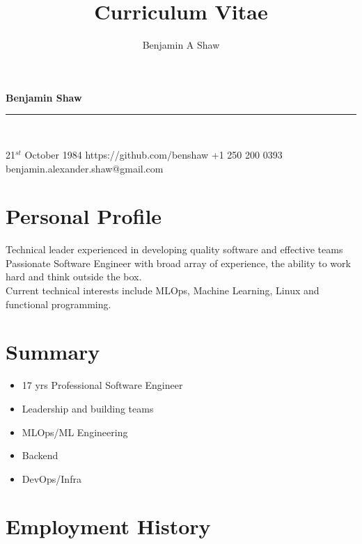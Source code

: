 \documentclass{article}
\title{Curriculum Vitae}
\author{Benjamin A Shaw}
\begin{document}
{\huge{\color{slateblue}\textbf{Benjamin Shaw}}}\\
\rule{\textwidth}{0.5mm}\\

\begin{personaldetails}
{21$^{st}$ October 1984}
{https://github.com/benshaw}
{+1 250 200 0393}
{benjamin.alexander.shaw@gmail.com}
\end{personaldetails}


\section*{Personal Profile}
\begin{profile}
Technical leader experienced in developing quality software and effective teams \\
Passionate Software Engineer with broad array of experience, the ability to work hard and think outside the box. \\
Current technical interests include MLOps, Machine Learning, Linux and functional programming.
\end{profile}

\section*{Summary}
\begin{itemize}
 \item 17 yrs Professional Software Engineer
 \item Leadership and building teams
 \item MLOps/ML Engineering
 \item Backend
 \item DevOps/Infra
\end{itemize}

\section*{Employment History}
\end{document}
